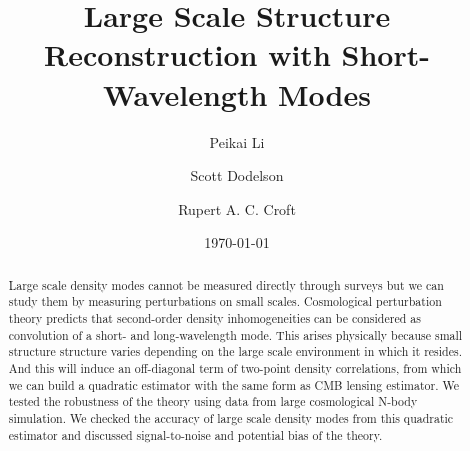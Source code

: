 \documentclass[prd,amsmath,amssymb,floatfix,superscriptaddress,nofootinbib,twocolumn]{revtex4-1}
\begin{document}
\title{Large Scale Structure Reconstruction with Short-Wavelength Modes}
\author{\large Peikai Li}
\author{\large Scott Dodelson}
\author{\large Rupert A. C. Croft}

\date{\today}
\begin{abstract}
\noindent Large scale density modes cannot be measured directly through surveys but we can study them by measuring perturbations on small scales. Cosmological perturbation theory predicts that second-order density inhomogeneities can be considered as convolution of a short- and long-wavelength mode. This arises physically because small structure structure varies depending on the large scale environment in which it resides. And this will induce an off-diagonal term of two-point density correlations, from which we can build a quadratic estimator with the same form as CMB lensing estimator. We tested the robustness of the theory using data from large cosmological N-body simulation. We checked the accuracy of large scale density modes from this quadratic estimator and discussed signal-to-noise and potential bias of the theory.

\end{abstract}
\maketitle
\end{document}
